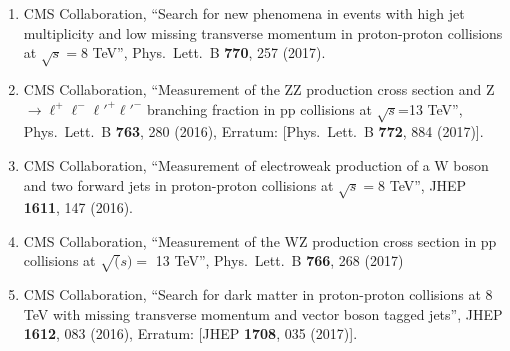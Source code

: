 \begin{itemize}
\begin{enumerate}
\item CMS Collaboration, ``Search for new phenomena in events with high jet multiplicity and low missing transverse momentum in proton-proton collisions at $\sqrt{s}=8$ TeV'', Phys.\ Lett.\ B {\bf 770}, 257 (2017).
  
\item CMS Collaboration, ``Measurement of the ZZ production cross section and Z $\to \ell^+\ell^-\ell'^+\ell'^-$ branching fraction in pp collisions at $\sqrt s$=13 TeV'', Phys.\ Lett.\ B {\bf 763}, 280 (2016), Erratum: [Phys.\ Lett.\ B {\bf 772}, 884 (2017)].

\item CMS Collaboration, ``Measurement of electroweak production of a W boson and two forward jets in proton-proton collisions at $ \sqrt{s}=8 $ TeV'', JHEP {\bf 1611}, 147 (2016).

\item CMS Collaboration, ``Measurement of the WZ production cross section in pp collisions at $\sqrt(s) =$ 13 TeV'', Phys.\ Lett.\ B {\bf 766}, 268 (2017)

\item CMS Collaboration, ``Search for dark matter in proton-proton collisions at 8 TeV with missing transverse momentum and vector boson tagged jets'', JHEP {\bf 1612}, 083 (2016), Erratum: [JHEP {\bf 1708}, 035 (2017)].


\end{enumerate}
\end{itemize}
